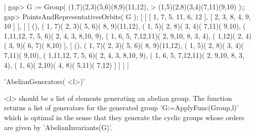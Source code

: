 |    gap> G := Group( (1,7)(2,3)(5,6)(8,9)(11,12),
    >                (1,5)(2,8)(3,4)(7,11)(9,10) );;
    gap> PointsAndRepresentativesOrbits( G );
    [ [ [ 1, 7, 5, 11, 6, 12 ], [ 2, 3, 8, 4, 9, 10 ] ],
      [ [ (), ( 1, 7)( 2, 3)( 5, 6)( 8, 9)(11,12),
              ( 1, 5)( 2, 8)( 3, 4)( 7,11)( 9,10),
              ( 1,11,12, 7, 5, 6)( 2, 4, 3, 8,10, 9),
              ( 1, 6, 5, 7,12,11)( 2, 9,10, 8, 3, 4),
              ( 1,12)( 2, 4)( 3, 9)( 6, 7)( 8,10) ],
          [ (), ( 1, 7)( 2, 3)( 5, 6)( 8, 9)(11,12),
              ( 1, 5)( 2, 8)( 3, 4)( 7,11)( 9,10),
              ( 1,11,12, 7, 5, 6)( 2, 4, 3, 8,10, 9),
              ( 1, 6, 5, 7,12,11)( 2, 9,10, 8, 3, 4),
              ( 1, 6)( 2,10)( 4, 8)( 5,11)( 7,12) ] ] ] |

%
%

'AbelianGenerators( <l>)'

<l>  should be a list of elements generating an abelian group. The function
returns a list of generators for the generated group
'G:=ApplyFunc(Group,l)'  which is optimal  in the sense  that they generate
the cyclic groups whose orders are given by 'AbelianInvariants(G)'.

